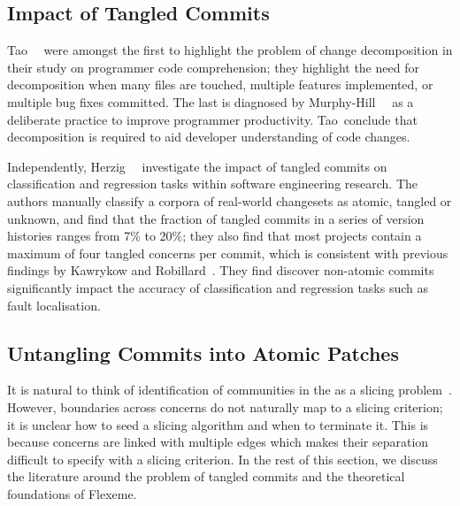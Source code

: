 \subsection{Impact of Tangled Commits}
\label{chapter:literature:sec:flexeme_rel_work:impact}

Tao~\etal~\cite{Tao2012} were amongst the first to highlight the problem of
change decomposition in their study on programmer code comprehension; they
highlight the need for decomposition when many files are touched, multiple
features implemented, or multiple bug fixes committed. The last is diagnosed by
Murphy-Hill~\etal~\cite{Murphy-Hill2012} as a deliberate practice to improve
programmer productivity. Tao~\etal conclude that decomposition is required to
aid developer understanding of code changes.

Independently, Herzig~\etal~\cite{Herzig2013, Herzig2016} investigate the impact
of tangled commits on classification and regression tasks within software
engineering research. The authors manually classify a corpora of real-world
changesets as atomic, tangled or unknown, and find that the fraction of tangled
commits in a series of version histories ranges from 7\% to 20\%; they also find
that most projects contain a maximum of four tangled concerns per commit, which
is  consistent with previous findings by Kawrykow and
Robillard~\cite{Kawrykow2011}. They find discover non-atomic commits
significantly impact the accuracy of classification and regression tasks such as
fault localisation. 

\subsection{Untangling Commits into Atomic Patches}
\label{chapter:literature:sec:flexeme_rel_work:untangle}

It is natural to think of identification of communities in the \deltaPDGN as a
slicing problem~\cite{slicingsurvey}. However, boundaries across concerns do not
naturally map to a slicing criterion; it is unclear how to seed a slicing
algorithm and when to terminate it. This is because concerns are linked with
multiple edges which makes their separation difficult to specify with a slicing
criterion. In the rest of this section, we discuss the literature around the
problem of tangled commits and the theoretical foundations of Flexeme.

